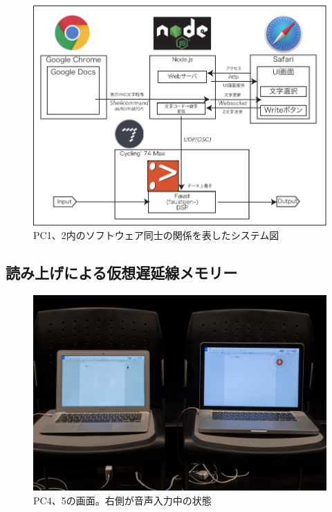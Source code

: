 \documentclass[a4paper,report]{jsbook}
\begin{document}
\begin{figure}[htbp]
\centering
\includegraphics[width=1.00000\textwidth]{./img/admpart_diagram.pdf}
\caption{PC1、2内のソフトウェア同士の関係を表したシステム図\label{fig:writer_system}}
\end{figure}

\subsection{読み上げによる仮想遅延線メモリー}\label{ux8aadux307fux4e0aux3052ux306bux3088ux308bux4eeeux60f3ux9045ux5ef6ux7ddaux30e1ux30e2ux30eaux30fc}

\begin{no-prefix-figure-caption}

\begin{figure}[htbp]
\centering
\includegraphics[width=1.00000\textwidth]{./img/adm2_archive2.jpg}
\caption{PC4、5の画面。右側が音声入力中の状態}
\end{figure}

\end{no-prefix-figure-caption}
\end{document}
